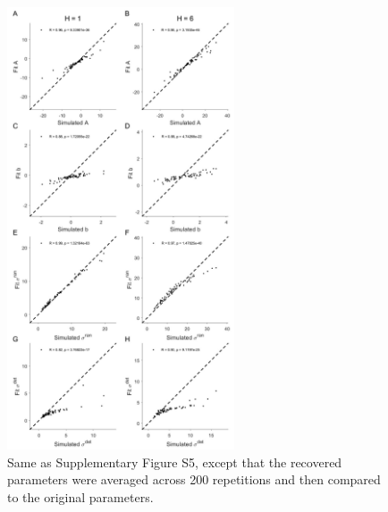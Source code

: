 \documentclass[12pt]{article}
\begin{document}
	\begin{figure}[hp]
		\begin{center}
			\includegraphics[width=0.6\textwidth]{figures/RDBayes_parameterrecovery_subject.jpg}
			\caption{Same as Supplementary Figure S5, except that the recovered parameters were averaged across 200 repetitions and then compared to the original parameters.}
			\label{fig:s6}
		\end{center}
	\end{figure} 
\newpage
\end{document}
